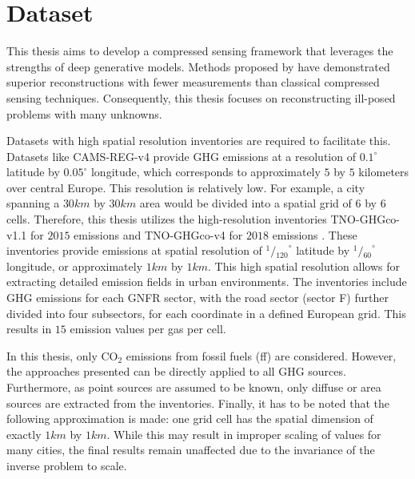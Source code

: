 
\chapter{Dataset}\label{chapter:dataset}

This thesis aims to develop a compressed sensing framework that leverages the strengths of deep generative models.
Methods proposed by \textcite{CSUsingAI} have demonstrated superior reconstructions with fewer measurements than classical compressed sensing techniques.
Consequently, this thesis focuses on reconstructing ill-posed problems with many unknowns.

Datasets with high spatial resolution inventories are required to facilitate this.
Datasets like CAMS-REG-v4 \parencite{CAMS} provide \gls{GHG} emissions at a resolution of $0.1^{\circ}$ latitude by $0.05^{\circ}$ longitude, which corresponds to approximately $5$ by $5$ kilometers over central Europe.
This resolution is relatively low.
For example, a city spanning a $30 \unit{km}$ by $30 \unit{km}$ area would be divided into a spatial grid of $6$ by $6$ cells.
Therefore, this thesis utilizes the high-resolution inventories TNO-GHGco-v1.1 for $2015$ emissions \parencite{TNO_HighRes15} and TNO-GHGco-v4 for $2018$ emissions \parencite{TNO_HighRes18}.
These inventories provide emissions at spatial resolution of ${{}^{1}\!/\!{}_{120}}^\circ$ latitude by ${{}^{1}\!/\!{}_{60}}^\circ$ longitude, or approximately $1 \unit{km}$ by $1 \unit{km}$.
This high spatial resolution allows for extracting detailed emission fields in urban environments.
The inventories include \gls{GHG} emissions for each GNFR sector, with the road sector (sector F) further divided into four subsectors, for each coordinate in a defined European grid.
This results in $15$ emission values per gas per cell.

In this thesis, only $\text{CO}_2$ emissions from fossil fuels (ff) are considered.
However, the approaches presented can be directly applied to all \gls{GHG} sources.
Furthermore, as point sources are assumed to be known, only diffuse or area sources are extracted from the inventories.
Finally, it has to be noted that the following approximation is made: one grid cell has the spatial dimension of exactly $1 \unit{km}$ by $1 \unit{km}$.
While this may result in improper scaling of values for many cities, the final results remain unaffected due to the invariance of the inverse problem to scale.

